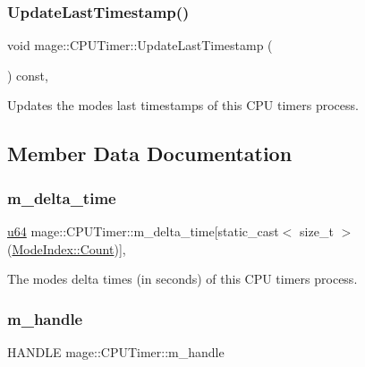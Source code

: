 \subsubsection{\texorpdfstring{Update\+Last\+Timestamp()}{UpdateLastTimestamp()}}
{\footnotesize\ttfamily void mage\+::\+C\+P\+U\+Timer\+::\+Update\+Last\+Timestamp (\begin{DoxyParamCaption}{ }\end{DoxyParamCaption}) const\hspace{0.3cm}{\ttfamily [private]}, {\ttfamily [noexcept]}}

Updates the modes\textquotesingle{} last timestamps of this C\+PU timer\textquotesingle{}s process. 

\subsection{Member Data Documentation}
\hypertarget{classmage_1_1_c_p_u_timer_ae26f6009f73955f99f54dae807948eed}{}\label{classmage_1_1_c_p_u_timer_ae26f6009f73955f99f54dae807948eed} 
\subsubsection{\texorpdfstring{m\+\_\+delta\+\_\+time}{m\_delta\_time}}
{\footnotesize\ttfamily \hyperlink{namespacemage_aee97da48a07394dd617c9deb60ed2064}{u64} mage\+::\+C\+P\+U\+Timer\+::m\+\_\+delta\+\_\+time\mbox{[}static\+\_\+cast$<$ size\+\_\+t $>$(\hyperlink{classmage_1_1_c_p_u_timer_a98d59db3c396b14269c937e016c7625eae93f994f01c537c4e2f7d8528c3eb5e9}{Mode\+Index\+::\+Count})\mbox{]}\hspace{0.3cm}{\ttfamily [mutable]}, {\ttfamily [private]}}

The modes\textquotesingle{} delta times (in seconds) of this C\+PU timer\textquotesingle{}s process. \hypertarget{classmage_1_1_c_p_u_timer_a95b8ac18c050ed25293c8a923087369a}{}\label{classmage_1_1_c_p_u_timer_a95b8ac18c050ed25293c8a923087369a} 
\subsubsection{\texorpdfstring{m\+\_\+handle}{m\_handle}}
{\footnotesize\ttfamily H\+A\+N\+D\+LE mage\+::\+C\+P\+U\+Timer\+::m\+\_\+handle\hspace{0.3cm}{\ttfamily [private]}}

